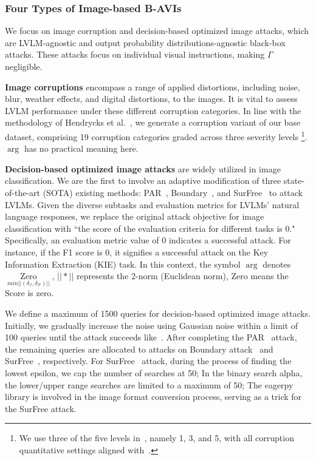 \subsubsection{Four Types of Image-based B-AVIs}

We focus on image corruption and decision-based optimized image attacks, which are LVLM-agnostic and output probability distributions-agnostic black-box attacks. 
These attacks focus on individual visual instructions, making $\Gamma$ negligible. 

\textbf{Image corruptions} encompass a range of applied distortions, including noise, blur, weather effects, and digital distortions, to the images. It is vital to assess LVLM performance under these different corruption categories. In line with the methodology of Hendrycks et al.~\cite{hendrycks2018benchmarking}, we generate a corruption variant of our base dataset, comprising 19 corruption categories graded across three severity levels \footnote{We use three of the five levels in~\cite{hendrycks2018benchmarking}, namely 1, 3, and 5, with all corruption quantitative settings aligned with~\cite{hendrycks2018benchmarking}.}.
$\mathop{\arg}$ has no practical meaning here.

\textbf{Decision-based optimized image attacks} are widely utilized in image classification. We are the first to involve an adaptive modification of three state-of-the-art (SOTA) existing methods: PAR~\cite{shi2022decision}, Boundary~\cite{brendel2017decision}, and SurFree~\cite{maho2021surfree} to attack LVLMs.
Given the diverse subtasks and evaluation metrics for LVLMs' natural language responses, we replace the original attack objective for image classification with ``the score of the evaluation criteria for different tasks is 0." Specifically, an evaluation metric value of 0 indicates a successful attack. For instance, if the F1 score is 0, it signifies a successful attack on the Key Information Extraction (KIE) task.
In this context, the symbol $\mathop{\arg}$ denotes $\mathop{\text{Zero}}\limits_{min||(\delta_{\mathcal{I}} ,\delta_{\mathcal{P}})||}$, $||*||$ represents the 2-norm (Euclidean norm), $\text{Zero}$ means the $\text{Score}$ is zero.

We define a maximum of 1500 queries for decision-based optimized image attacks. Initially, we gradually increase the noise using Gaussian noise within a limit of 100 queries until the attack succeeds like~\cite{shi2022decision}. After completing the PAR~\cite{shi2022decision} attack, the remaining queries are allocated to attacks on Boundary attack~\cite{brendel2017decision} and SurFree~\cite{maho2021surfree}, respectively. For SurFree~\cite{maho2021surfree} attack, during the process of finding the lowest epsilon, we cap the number of searches at 50; In the binary search alpha, the lower/upper range searches are limited to a maximum of 50; The eagerpy library is involved in the image format conversion process, serving as a trick for the SurFree attack.

